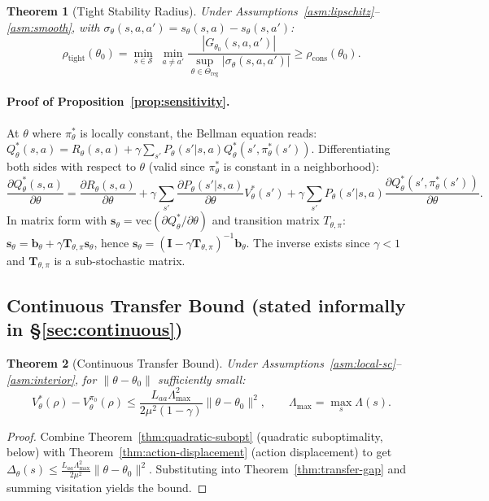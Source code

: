 \documentclass{article}
\newtheorem{theorem}{Theorem}
\newcommand{\cS}{\mathcal{S}}
\begin{document}
\begin{theorem}[Tight Stability Radius]
\label{thm:tight-stability}
Under Assumptions~\ref{asm:lipschitz}--\ref{asm:smooth}, with $\sigma_\theta(s,a,a') = s_\theta(s,a) - s_\theta(s,a')$:
\begin{equation}
\rho_{\mathrm{tight}}(\theta_0) = \min_{s \in \cS}\;\min_{a \neq a'} \frac{|G_{\theta_0}(s,a,a')|}{\sup_{\theta \in \Theta_{\mathrm{reg}}}|\sigma_\theta(s,a,a')|} \geq \rho_{\mathrm{cons}}(\theta_0).
\end{equation}
\end{theorem}

\paragraph{Proof of Proposition~\ref{prop:sensitivity}.}
At $\theta$ where $\pi^*_\theta$ is locally constant, the Bellman equation reads:
$Q^*_\theta(s,a) = R_\theta(s,a) + \gamma\sum_{s'}P_\theta(s'|s,a)Q^*_\theta(s', \pi^*_\theta(s'))$.
Differentiating both sides with respect to $\theta$ (valid since $\pi^*_\theta$ is constant in a neighborhood):
\begin{equation}
\frac{\partial Q^*_\theta(s,a)}{\partial\theta} = \frac{\partial R_\theta(s,a)}{\partial\theta} + \gamma\sum_{s'}\frac{\partial P_\theta(s'|s,a)}{\partial\theta}V^*_\theta(s') + \gamma\sum_{s'}P_\theta(s'|s,a)\frac{\partial Q^*_\theta(s', \pi^*_\theta(s'))}{\partial\theta}.
\end{equation}
In matrix form with $\mathbf{s}_\theta = \mathrm{vec}(\partial Q^*_\theta/\partial\theta)$ and transition matrix $T_{\theta,\pi}$:
$\mathbf{s}_\theta = \mathbf{b}_\theta + \gamma\mathbf{T}_{\theta,\pi}\mathbf{s}_\theta$,
hence $\mathbf{s}_\theta = (\mathbf{I} - \gamma\mathbf{T}_{\theta,\pi})^{-1}\mathbf{b}_\theta$. The inverse exists since $\gamma < 1$ and $\mathbf{T}_{\theta,\pi}$ is a sub-stochastic matrix.

\subsection{Continuous Transfer Bound (stated informally in \S\ref{sec:continuous})}

\begin{theorem}[Continuous Transfer Bound]
\label{thm:continuous-bound}
Under Assumptions~\ref{asm:local-sc}--\ref{asm:interior}, for $\|\theta - \theta_0\|$ sufficiently small:
\[
V^*_{\theta}(\rho) - V^{\pi_0}_{\theta}(\rho) \leq \frac{L_{aa}\Lambda_{\max}^2}{2\mu^2(1-\gamma)}\|\theta - \theta_0\|^2, \qquad \Lambda_{\max} = \max_s \Lambda(s).
\]
\end{theorem}
\begin{proof}
Combine Theorem~\ref{thm:quadratic-subopt} (quadratic suboptimality, below) with Theorem~\ref{thm:action-displacement} (action displacement) to get $\Delta_\theta(s) \leq \tfrac{L_{aa}\Lambda_{\max}^2}{2\mu^2}\|\theta - \theta_0\|^2$. Substituting into Theorem~\ref{thm:transfer-gap} and summing visitation yields the bound.
\end{proof}
\end{document}

